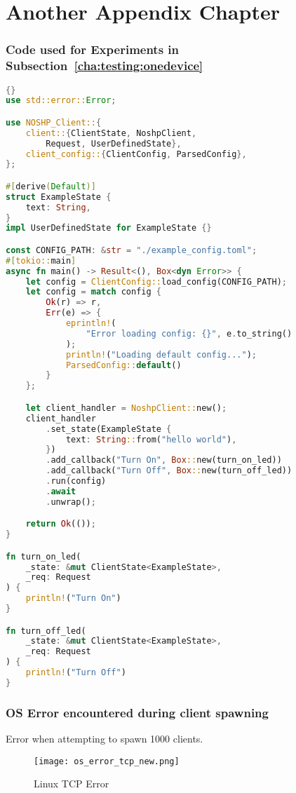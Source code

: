 
\chapter{Another Appendix Chapter}
\label{chap:A2}

\subsection{Code used for Experiments in Subsection~\ref{cha:testing:onedevice}} \label{chap:A2:onedeviceclientlib}
\begin{lstlisting}[language=Rust, style=boxed, showstringspaces=false]{}
use std::error::Error;

use NOSHP_Client::{
    client::{ClientState, NoshpClient, 
        Request, UserDefinedState},
    client_config::{ClientConfig, ParsedConfig},
};

#[derive(Default)]
struct ExampleState {
    text: String,
}
impl UserDefinedState for ExampleState {}

const CONFIG_PATH: &str = "./example_config.toml";
#[tokio::main]
async fn main() -> Result<(), Box<dyn Error>> {
    let config = ClientConfig::load_config(CONFIG_PATH);
    let config = match config {
        Ok(r) => r,
        Err(e) => {
            eprintln!(
                "Error loading config: {}", e.to_string()
            );
            println!("Loading default config...");
            ParsedConfig::default()
        }
    };

    let client_handler = NoshpClient::new();
    client_handler
        .set_state(ExampleState {
            text: String::from("hello world"),
        })
        .add_callback("Turn On", Box::new(turn_on_led))
        .add_callback("Turn Off", Box::new(turn_off_led))
        .run(config)
        .await
        .unwrap();

    return Ok(());
}

fn turn_on_led(
    _state: &mut ClientState<ExampleState>,
    _req: Request
) {
    println!("Turn On")
}

fn turn_off_led(
    _state: &mut ClientState<ExampleState>,
    _req: Request
) {
    println!("Turn Off")
}
\end{lstlisting}

\pagebreak
\subsection{OS Error encountered during client spawning} 
Error when attempting to spawn 1000 clients.
\label{chap:A2:oserror}
\begin{figure}[h]
\caption{Linux TCP Error}
\texttt{[image: os\_error\_tcp\_new.png]}
\label{fig:tcperror}
\end{figure}


